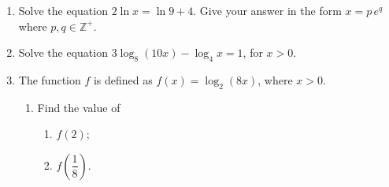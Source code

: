 \documentclass[12pt, twoside]{article}
\begin{document}
\begin{enumerate}[itemsep=0.15cm]
\begin{enumerate}[itemsep=0.15cm]
  \item $\log_{10}\!\left(\dfrac{1}{a}\right)$;

  \item $\log_{1000} a$.
\end{enumerate}


\newpage

\item[4.] Solve the equation $2\ln x = \ln 9 + 4$. Give your answer in
the form $x = p\, e^{q}$ where $p, q \in \mathbb{Z}^{+}$.


\newpage

\item[5.] Solve the equation
$3\log_{8}(10x) - \log_{4} x = 1$, \;for $x > 0$.


\newpage

\item[6.] The function $f$ is defined as $f(x) = \log_{2}(8x)$, where
$x > 0$.

\begin{enumerate}[itemsep=0.15cm]
  \item[(a)] Find the value of
  \begin{enumerate}[label=(\roman*), itemsep=0.15cm]
    \item $f(2)$;

    \item $f\!\left(\dfrac{1}{8}\right)$.
  \end{enumerate}


\end{enumerate}
\end{enumerate}
\end{document}
